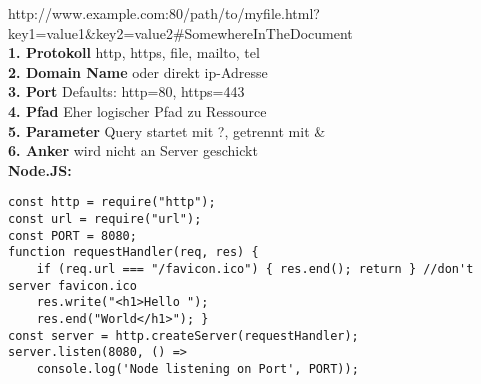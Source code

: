 \documentclass[7pt,landscape,a4paper]{scrartcl}
\begin{document}
\begin{multicols*}{4}
	http://www.example.com:80/path/to/myfile.html?\\
	key1=value1\&key2=value2\#SomewhereInTheDocument\\
	\textbf{1. Protokoll} http, https, file, mailto, tel\\
	\textbf{2. Domain Name} oder direkt ip-Adresse\\
	\textbf{3. Port} Defaults: http=80, https=443\\
	\textbf{4. Pfad} Eher logischer Pfad zu Ressource\\
	\textbf{5. Parameter} Query startet mit ?, getrennt mit \&\\
	\textbf{6. Anker} wird nicht an Server geschickt\\
	\textcolor{b}{\textbf{Node.JS:}}
\begin{lstlisting}[style=htmlcssjs]
const http = require("http");
const url = require("url");
const PORT = 8080;
function requestHandler(req, res) {
	if (req.url === "/favicon.ico") { res.end(); return } //don't server favicon.ico
	res.write("<h1>Hello ");
	res.end("World</h1>"); }
const server = http.createServer(requestHandler);
server.listen(8080, () =>
	console.log('Node listening on Port', PORT));
\end{lstlisting}

\end{multicols*}
\end{document}
